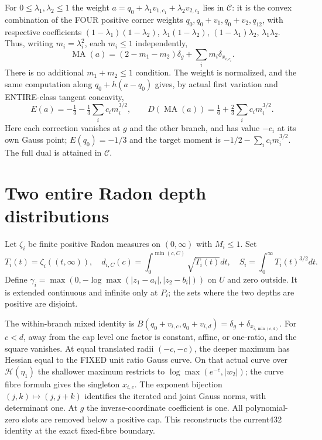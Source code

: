 \documentclass[11pt]{article}
\newcommand{\MA}{\operatorname{MA}}
\newcommand{\C}{\mathcal C}
\begin{document}
For $0\le\lambda_1,\lambda_2\le1$ the weight
$a=q_0+\lambda_1v_{1,c_1}+\lambda_2v_{2,c_2}$ lies in $\C$:
it is the convex combination of the FOUR positive corner weights
$q_0,q_0+v_1,q_0+v_2,q_{12}$, with respective coefficients
$(1-\lambda_1)(1-\lambda_2)$, $\lambda_1(1-\lambda_2)$,
$(1-\lambda_1)\lambda_2$, $\lambda_1\lambda_2$.
Thus, writing $m_i=\lambda_i^2$, each $m_i\le1$ independently,
\[
 \MA(a)=(2-m_1-m_2)\delta_g+\sum_i m_i\delta_{x_{i,c_i}}.
\]
There is no additional $m_1+m_2\le1$ condition.
The weight is normalized, and the same computation along $q_0+h(a-q_0)$
gives, by actual first variation and ENTIRE-class tangent concavity,
\[
 E(a)=-\tfrac13-\tfrac13\sum_i c_i m_i^{3/2},\qquad
 D(\MA(a))=\tfrac16+\tfrac23\sum_i c_i m_i^{3/2}.
\]
Here each correction vanishes at $g$ and the other branch, and has value
$-c_i$ at its own Gauss point; $E(q_0)=-1/3$ and the target moment is
$-1/2-\sum_i c_i m_i^{3/2}$. The full dual is attained in $\C$.

\section{Two entire Radon depth distributions}
Let $\zeta_i$ be finite positive Radon measures on $(0,\infty)$ with
$M_i\le1$. Set
\[
 T_i(t)=\zeta_i((t,\infty)),\quad
 d_{i,C}(c)=\int_0^{\min(c,C)}\sqrt{T_i(t)}dt,\quad
 S_i=\int_0^\infty T_i(t)^{3/2}dt.
\]
Define $\gamma_i=\max(0,-\log\max(|z_1-a_i|,|z_2-b_i|))$ on $U$
and zero outside. It is extended continuous and infinite only at $P_i$;
the sets where the two depths are positive are disjoint.

The within-branch mixed identity is
$B(q_0+v_{i,c},q_0+v_{i,d})=\delta_g+\delta_{x_{i,\min(c,d)}}$.
For $c<d$, away from the cap level one factor is constant, affine, or
one-ratio, and the square vanishes. At equal translated radii $(-c,-c)$,
the deeper maximum has Hessian equal to the FIXED unit ratio Gauss
curve. On that actual curve over $\mathscr H(\eta_1)$ the shallower
maximum restricts to $\log\max(e^{-c},|w_2|)$; the curve fibre formula
gives the singleton $x_{i,c}$. The exponent bijection
$(j,k)\mapsto(j,j+k)$ identifies the iterated and joint Gauss norms,
with determinant one. At $g$ the inverse-coordinate coefficient is one.
All polynomial-zero slots are removed below a positive cap. This
reconstructs the current432 identity at the exact fixed-fibre boundary.
\end{document}
